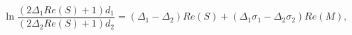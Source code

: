 \begin{equation}
\ln \frac{(2\Delta_1 Re(S)+1)d_1}{(2\Delta_2 Re(S)+1)d_2} = 
(\Delta_1 - \Delta_2)Re(S) + (\Delta_1 \sigma_1 - \Delta_2 \sigma_2)
Re(M) ,
\label{RT-sol-3}
\end{equation}

